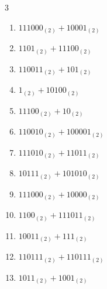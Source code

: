 \begin{multicols}{3}
\begin{enumerate}

  \item $111000_{(2)} + 10001_{(2)}$


  \item $1101_{(2)} + 11100_{(2)}$


\columnbreak %

  \item $110011_{(2)} + 101_{(2)}$


  \item $1_{(2)} + 10100_{(2)}$


  \item $11100_{(2)} + 10_{(2)}$


  \item $110010_{(2)} + 100001_{(2)}$


  \item $111010_{(2)} + 11011_{(2)}$


  \item $10111_{(2)} + 101010_{(2)}$


  \item $111000_{(2)} + 10000_{(2)}$


  \item $1100_{(2)} + 111011_{(2)}$


  \item $10011_{(2)} + 111_{(2)}$


  \item $110111_{(2)} + 110111_{(2)}$


\columnbreak %

\resetques

  \item $1011_{(2)} + 1001_{(2)}$


\end{enumerate}
\end{multicols}
